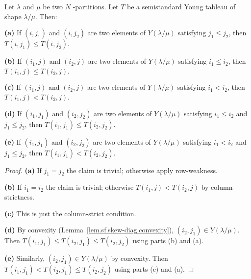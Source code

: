 \begin{lemma}
\label{lem.sf.skew-ssyt.increase}
\leantarget
\leanok
Let $\lambda$ and $\mu$ be two $N$%
-partitions. Let $T$ be a semistandard Young tableau of shape $\lambda/\mu$.
Then: \medskip

\textbf{(a)} If $\left(  i,j_{1}\right)  $ and $\left(  i,j_{2}\right)  $ are
two elements of $Y\left(  \lambda/\mu\right)  $ satisfying $j_{1}\leq j_{2}$,
then $T\left(  i,j_{1}\right)  \leq T\left(  i,j_{2}\right)  $. \medskip

\textbf{(b)} If $\left(  i_{1},j\right)  $ and $\left(  i_{2},j\right)  $ are
two elements of $Y\left(  \lambda/\mu\right)  $ satisfying $i_{1}\leq i_{2}$,
then $T\left(  i_{1},j\right)  \leq T\left(  i_{2},j\right)  $. \medskip

\textbf{(c)} If $\left(  i_{1},j\right)  $ and $\left(  i_{2},j\right)  $ are
two elements of $Y\left(  \lambda/\mu\right)  $ satisfying $i_{1}<i_{2}$, then
$T\left(  i_{1},j\right)  <T\left(  i_{2},j\right)  $. \medskip

\textbf{(d)} If $\left(  i_{1},j_{1}\right)  $ and $\left(  i_{2}%
,j_{2}\right)  $ are two elements of $Y\left(  \lambda/\mu\right)  $
satisfying $i_{1}\leq i_{2}$ and $j_{1}\leq j_{2}$, then $T\left(  i_{1}%
,j_{1}\right)  \leq T\left(  i_{2},j_{2}\right)  $. \medskip

\textbf{(e)} If $\left(  i_{1},j_{1}\right)  $ and $\left(  i_{2}%
,j_{2}\right)  $ are two elements of $Y\left(  \lambda/\mu\right)  $
satisfying $i_{1}<i_{2}$ and $j_{1}\leq j_{2}$, then $T\left(  i_{1}%
,j_{1}\right)  <T\left(  i_{2},j_{2}\right)  $.
\end{lemma}

\begin{proof}
\textbf{(a)} If $j_1 = j_2$ the claim is trivial; otherwise apply row-weakness.

\textbf{(b)} If $i_1 = i_2$ the claim is trivial; otherwise
$T(i_1,j) < T(i_2,j)$ by column-strictness.

\textbf{(c)} This is just the column-strict condition.

\textbf{(d)} By convexity (Lemma~\ref{lem.sf.skew-diag.convexity}),
$(i_2, j_1) \in Y(\lambda/\mu)$.
Then $T(i_1, j_1) \le T(i_2, j_1) \le T(i_2, j_2)$ using parts (b) and (a).

\textbf{(e)} Similarly, $(i_2, j_1) \in Y(\lambda/\mu)$ by convexity.
Then $T(i_1, j_1) < T(i_2, j_1) \le T(i_2, j_2)$ using parts (c) and (a).
\end{proof}

